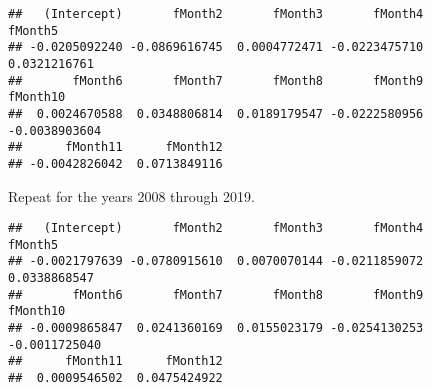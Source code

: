 \documentclass[
]{article}
\newenvironment{Shaded}{\begin{snugshade}}{\end{snugshade}}
\newcommand{\AttributeTok}[1]{\textcolor[rgb]{0.13,0.29,0.53}{#1}}
\newcommand{\CommentTok}[1]{\textcolor[rgb]{0.56,0.35,0.01}{\textit{#1}}}
\newcommand{\DecValTok}[1]{\textcolor[rgb]{0.00,0.00,0.81}{#1}}
\newcommand{\FunctionTok}[1]{\textcolor[rgb]{0.13,0.29,0.53}{\textbf{#1}}}
\newcommand{\NormalTok}[1]{#1}
\newcommand{\OtherTok}[1]{\textcolor[rgb]{0.56,0.35,0.01}{#1}}
\newcommand{\SpecialCharTok}[1]{\textcolor[rgb]{0.81,0.36,0.00}{\textbf{#1}}}
\begin{document}
\begin{verbatim}
##   (Intercept)       fMonth2       fMonth3       fMonth4       fMonth5 
## -0.0205092240 -0.0869616745  0.0004772471 -0.0223475710  0.0321216761 
##       fMonth6       fMonth7       fMonth8       fMonth9      fMonth10 
##  0.0024670588  0.0348806814  0.0189179547 -0.0222580956 -0.0038903604 
##      fMonth11      fMonth12 
## -0.0042826042  0.0713849116
\end{verbatim}

Repeat for the years 2008 through 2019.

\begin{Shaded}
\end{Shaded}

\begin{verbatim}
##   (Intercept)       fMonth2       fMonth3       fMonth4       fMonth5 
## -0.0021797639 -0.0780915610  0.0070070144 -0.0211859072  0.0338868547 
##       fMonth6       fMonth7       fMonth8       fMonth9      fMonth10 
## -0.0009865847  0.0241360169  0.0155023179 -0.0254130253 -0.0011725040 
##      fMonth11      fMonth12 
##  0.0009546502  0.0475424922
\end{verbatim}
\end{document}

